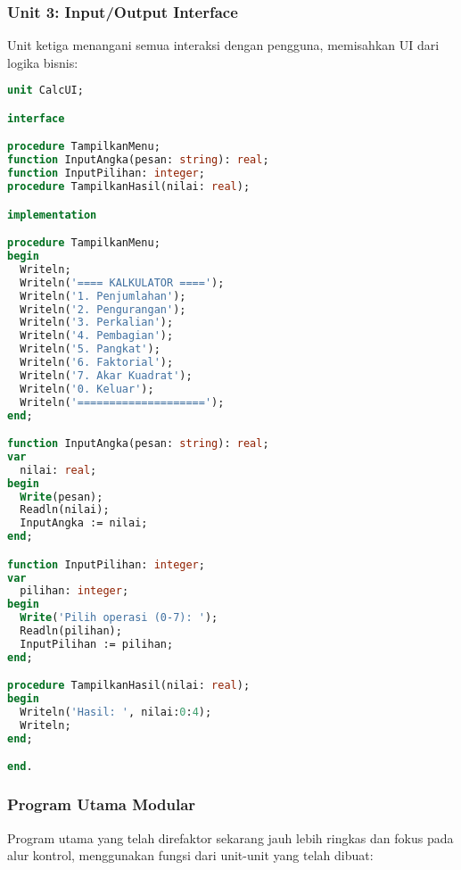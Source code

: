 \documentclass[../main.tex]{subfiles}
\begin{document}
\subsubsection{Unit 3: Input/Output Interface}

Unit ketiga menangani semua interaksi dengan pengguna, memisahkan UI dari logika bisnis:

\begin{lstlisting}[language=Pascal, caption={calcui.pas - antarmuka pengguna}]
unit CalcUI;

interface

procedure TampilkanMenu;
function InputAngka(pesan: string): real;
function InputPilihan: integer;
procedure TampilkanHasil(nilai: real);

implementation

procedure TampilkanMenu;
begin
  Writeln;
  Writeln('==== KALKULATOR ====');
  Writeln('1. Penjumlahan');
  Writeln('2. Pengurangan');
  Writeln('3. Perkalian');
  Writeln('4. Pembagian');
  Writeln('5. Pangkat');
  Writeln('6. Faktorial');
  Writeln('7. Akar Kuadrat');
  Writeln('0. Keluar');
  Writeln('====================');
end;

function InputAngka(pesan: string): real;
var
  nilai: real;
begin
  Write(pesan);
  Readln(nilai);
  InputAngka := nilai;
end;

function InputPilihan: integer;
var
  pilihan: integer;
begin
  Write('Pilih operasi (0-7): ');
  Readln(pilihan);
  InputPilihan := pilihan;
end;

procedure TampilkanHasil(nilai: real);
begin
  Writeln('Hasil: ', nilai:0:4);
  Writeln;
end;

end.
\end{lstlisting}

\subsubsection{Program Utama Modular}

Program utama yang telah direfaktor sekarang jauh lebih ringkas dan fokus pada alur kontrol, menggunakan fungsi dari unit-unit yang telah dibuat:
\end{document}
